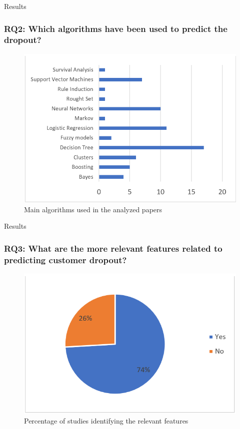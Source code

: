 \documentclass[10pt]{beamer}
\begin{document}
\begin{frame}[fragile]{Results}
	\frametitle{RQ2: Which algorithms have been used to predict the dropout?}
	\begin{figure}
		\includegraphics[scale=0.5]{../img/mainAlgorithms.png}
		\caption{Main algorithms used in the analyzed papers}
		\label{figure3}
	\end{figure}
\end{frame}

\begin{frame}[fragile]{Results}
	\frametitle{RQ3: What are the more relevant features related to predicting customer dropout?}
	\begin{figure}
		\includegraphics[scale=0.5]{../img/relevantFeatures.png}
		\caption{Percentage of studies identifying the relevant features}
		\label{figure4}
	\end{figure}
\end{frame}

\end{document}
